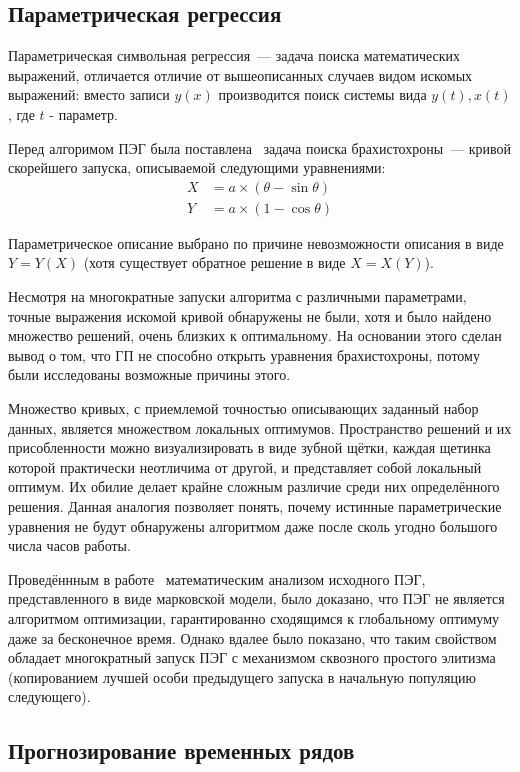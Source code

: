 \subsection{Параметрическая регрессия}

Параметрическая символьная регрессия~--- задача поиска математических выражений, отличается отличие от вышеописанных случаев видом искомых выражений: вместо записи $y(x)$ производится поиск системы вида $y(t), x(t)$, где $t$ - параметр.

Перед алгоримом ПЭГ была поставлена~\cite{banks:2004:msa:erban} задача поиска брахистохроны~--- кривой скорейшего запуска, описываемой следующими уравнениями:
\begin{eqnarray}
X & = a\times(\theta - \sin{\theta})\\
Y & = a\times(1 - \cos{\theta})
\end{eqnarray}

Параметрическое описание выбрано по причине невозможности описания в виде $Y=Y(X)$ (хотя существует обратное решение в виде $X=X(Y)$).

Несмотря на многократные запуски алгоритма с различными параметрами, точные выражения искомой кривой обнаружены не были, хотя и было найдено множество решений, очень близких к оптимальному. На основании этого сделан вывод о том, что ГП не способно открыть уравнения брахистохроны, потому были исследованы возможные причины этого.

Множество кривых, с приемлемой точностью описывающих заданный набор данных, является множеством локальных оптимумов. Пространство решений и их присобленности можно визуализировать в виде зубной щётки, каждая щетинка которой практически неотличима от другой, и представляет собой локальный оптимум. Их обилие делает крайне сложным различие среди них определённого решения. Данная аналогия позволяет понять, почему истинные параметрические уравнения не будут обнаружены алгоритмом даже после сколь угодно большого числа часов работы.

Проведённным в работе~\cite{chen2012some} математическим анализом исходного ПЭГ, представленного в виде марковской модели, было доказано, что ПЭГ не является алгоритмом оптимизации, гарантированно сходящимся к глобальному оптимуму даже за бесконечное время. Однако вдалее было показано, что таким свойством обладает многократный запуск ПЭГ с механизмом сквозного простого элитизма (копированием лучшей особи предыдущего запуска в начальную популяцию следующего).


\subsection{Прогнозирование временных рядов}

